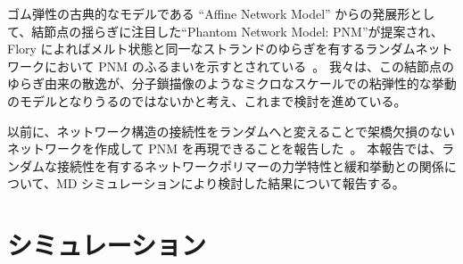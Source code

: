 \documentclass[uplatex,10pt,a4paper,twocolumn]{jsarticle}
\begin{document}
ゴム弾性の古典的なモデルである ``Affine Network Model'' からの発展形として、結節点の揺らぎに注目した``Phantom Network Model: PNM''が提案され、Flory によればメルト状態と同一なストランドのゆらぎを有するランダムネットワークにおいて PNM のふるまいを示すとされている~\cite{flory}。
我々は、この結節点のゆらぎ由来の散逸が、分子鎖描像のようなミクロなスケールでの粘弾性的な挙動のモデルとなりうるのではないかと考え、これまで検討を進めている。

以前に、ネットワーク構造の接続性をランダムへと変えることで架橋欠損のないネットワークを作成して PNM を再現できることを報告した~\cite{sasaki}。
本報告では、ランダムな接続性を有するネットワークポリマーの力学特性と緩和挙動との関係について、MD シミュレーションにより検討した結果について報告する。





\section{シミュレーション}
\end{document}
